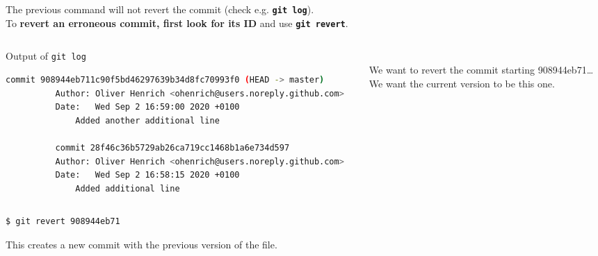 \begin{frame}[fragile]
\emptyframetitle
  The previous command will not revert the commit (check e.g. \texttt{\textbf{git log}}).\\[0.25cm]

  To \textbf{revert an erroneous commit, first look for its ID} and use \texttt{\textbf{git revert}}.

  \begin{columns}
    \begin{column}{0.55\textwidth}
      \begin{block}{Output of \texttt{git log}}
        \begin{lstlisting}[language=bash, basicstyle=\tiny\ttfamily]
          commit 908944eb711c90f5bd46297639b34d8fc70993f0 (HEAD -> master)
          Author: Oliver Henrich <ohenrich@users.noreply.github.com>
          Date:   Wed Sep 2 16:59:00 2020 +0100
              Added another additional line

          commit 28f46c36b5729ab26ca719cc1468b1a6e734d597
          Author: Oliver Henrich <ohenrich@users.noreply.github.com>
          Date:   Wed Sep 2 16:58:15 2020 +0100
              Added additional line
        \end{lstlisting}
      \end{block}
    \end{column}

    \begin{column}{0.425\textwidth}
      \vspace*{1.cm}\\
      We want to revert the commit starting 908944eb71\dots
      \vspace*{0.8cm}\\
      We want the current version to be this one.
    \end{column}
  \end{columns}


  \begin{lstlisting}[language=bash]
    $ git revert 908944eb71 
  \end{lstlisting}

  This creates a new commit with the previous version of the file.

\end{frame}

